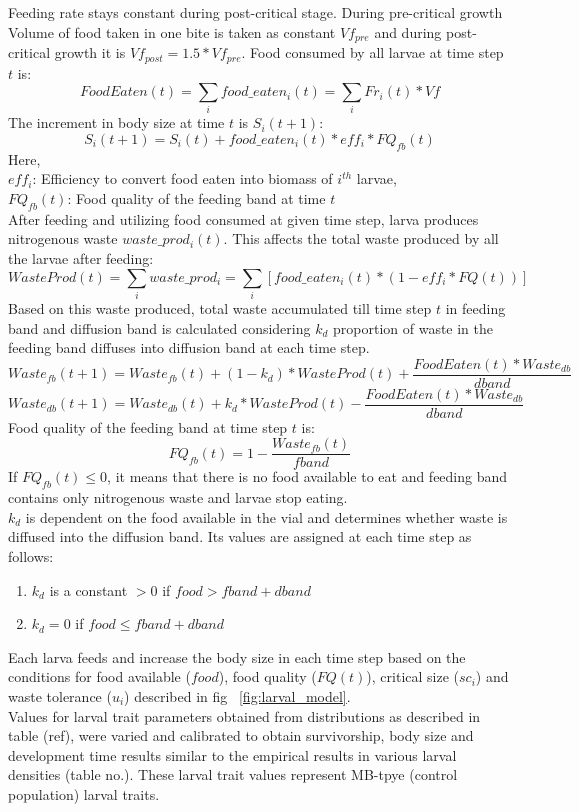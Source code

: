 Feeding rate stays constant during post-critical stage. During pre-critical growth Volume of food taken in one bite is taken as constant $Vf_{pre}$ and during post-critical growth it is $Vf_{post} = 1.5*Vf_{pre}$. Food consumed by all larvae at time step $t$ is:
\[FoodEaten(t) = \sum_{i}food\_eaten_{i}(t) = \sum_{i}Fr_{i}(t)*Vf\]
The increment in body size at time $t$ is $S_{i}(t+1)$:
\[S_{i}(t+1) = S_{i}(t) + food\_eaten_{i}(t)*eff_{i}*FQ_{fb}(t)\]
Here,\\
$eff_{i}$: Efficiency to convert food eaten into biomass of $i^{th}$ larvae,\\
$FQ_{fb}(t)$: Food quality of the feeding band at time $t$ \\
After feeding and utilizing food consumed at given time step, larva produces nitrogenous waste $waste\_prod_{i}(t)$. This affects the total waste produced by all the larvae after feeding:
\[WasteProd(t) = \sum_{i}waste\_prod_{i} = \sum_{i}[food\_eaten_{i}(t)*(1-eff_{i}*FQ(t))]\]
Based on this waste produced, total waste accumulated till time step $t$ in feeding band and diffusion band is calculated considering $k_{d}$ proportion of waste in the feeding band diffuses into diffusion band at each time step.
\[Waste_{fb}(t+1) = Waste_{fb}(t) + (1-k_{d})*WasteProd(t) + \frac{FoodEaten(t)*Waste_{db}}{dband}\]
\[Waste_{db}(t+1) = Waste_{db}(t) + k_{d}*WasteProd(t) - \frac{FoodEaten(t)*Waste_{db}}{dband}\]
Food quality of the feeding band at time step $t$ is:
\[FQ_{fb}(t) = 1 - \frac{Waste_{fb}(t)}{fband}\]
If $FQ_{fb}(t) \leq 0 $, it means that there is no food available to eat and feeding band contains only nitrogenous waste and larvae stop eating.\\
$k_{d}$ is dependent on the food available in the vial and determines whether waste is diffused into the diffusion band. Its values are assigned at each time step as follows:
\begin{enumerate}[i]
  \item $k_{d}$ is a constant $> 0$ if $food > fband+dband$
  \item $k_{d} = 0$ if $food \leq fband+dband$
\end{enumerate}
Each larva feeds and increase the body size in each time step based on the conditions for food available ($food$), food quality ($FQ(t)$), critical size ($sc_{i}$) and waste tolerance ($u_{i}$) described in fig ~\ref{fig:larval_model}.\\
Values for larval trait parameters obtained from distributions as described in table (ref), were varied and calibrated to obtain survivorship, body size and development time results similar to the empirical results in various larval densities (table no.). These larval trait values represent MB-tpye (control population) larval traits.

